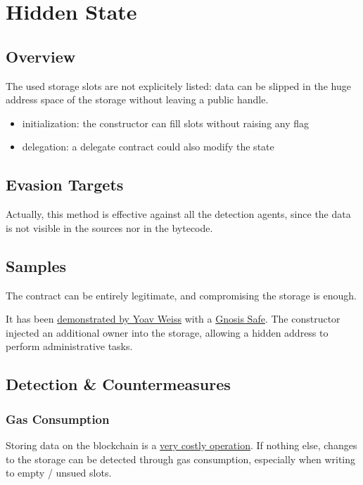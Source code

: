\section{Hidden State} \label{sec:hidden-state}

\subsection{Overview}

The used storage slots are not explicitely listed: data can be slipped in the huge address space of the storage without leaving a public handle.

\begin{itemize}
\item{initialization: the constructor can fill slots without raising any flag}
\item{delegation: a delegate contract could also modify the state}
\end{itemize}

\subsection{Evasion Targets}

Actually, this method is effective against all the detection agents, since the data is not visible in the sources nor in the bytecode.

\subsection{Samples}

The contract can be entirely legitimate, and compromising the storage is enough.

It has been \href{\urlvideomasqueradingcode}{demonstrated by Yoav Weiss} with a \href{https://github.com/safe-global/safe-contracts}{Gnosis Safe}.
The constructor injected an additional owner into the storage, allowing a hidden address to perform administrative tasks.

\subsection{Detection \& Countermeasures}

\subsubsection{Gas Consumption}

Storing data on the blockchain is a \href{\urldocsgascost}{very costly operation}.
If nothing else, changes to the storage can be detected through gas consumption, especially when writing to empty / unsued slots.
